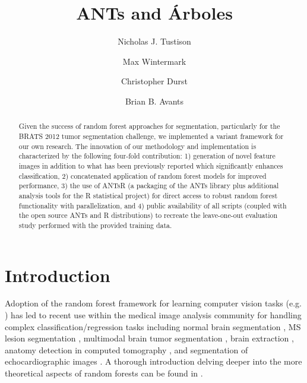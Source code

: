 \documentclass{llncs}
\begin{document}
%
\frontmatter          %
%

\mainmatter              %
%
\title{ANTs and \'{A}rboles}
%
\titlerunning{}  %
%
\author{Nicholas J. Tustison \and Max Wintermark \and Christopher Durst \and Brian B. Avants}


\maketitle              %

\begin{abstract}
Given the success of random forest approaches for segmentation, particularly for 
the BRATS 2012 tumor segmentation challenge, we implemented
a variant framework for our own research. 
The innovation of our methodology and implementation is characterized by 
the following four-fold contribution:
1) generation of
novel feature images in addition to what has been previously 
reported which significantly enhances classification,  2) 
concatenated application of random forest models for improved performance, 
3) the use of ANTsR (a packaging of the ANTs library plus 
additional analysis tools for
the R statistical project) for direct access to robust 
random forest functionality with parallelization, and 4) 
public availability of all scripts (coupled with the 
open source ANTs and R distributions) to recreate the 
leave-one-out evaluation study performed with the provided 
training data.
\end{abstract}

\section{Introduction}

Adoption of the random forest framework \cite{breiman1996} for learning computer vision tasks (e.g. \cite{viola2005}) has led to recent use within 
the medical image analysis community for handling complex classification/regression tasks including normal brain segmentation \cite{yi2009},
MS lesion segmentation \cite{geremia2011}, multimodal brain tumor segmentation
\cite{zikic2012,geremia2012}, brain extraction \cite{iglesias2010}, 
anatomy detection in computed tomography \cite{criminisi2013}, and
segmentation of echocardiographic images \cite{verhoek2011}.
A thorough introduction delving deeper into the more theoretical aspects 
of random forests can be found in \cite{criminisi2011}.
\end{document}
